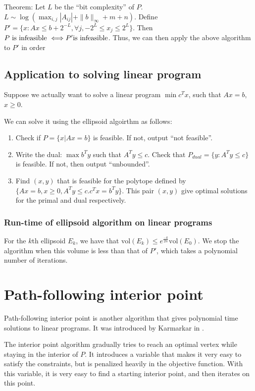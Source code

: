 \documentclass[11pt]{article}
\begin{document}
Theorem: Let $L$ be the ``bit complexity'' of $P$. $L\sim\log(\max_{i,j}|A_{ij}|+\|b\|_{\infty}+m+n)$.
Define $P'=\{x:Ax\leq b+2^{-L},\forall j,-2^{L}\leq x_{j}\leq2^{L}\}$.
Then $P\mbox{ is infeasible \ensuremath{\iff}\ensuremath{P'}is infeasible}$.
Thus, we can then apply the above algorithm to $P'$ in order 


\subsection{Application to solving linear program}

Suppose we actually want to solve a linear program $\min c^{T}x$,
such that $Ax=b$, $x\geq0$.

We can solve it using the ellipsoid algoirthm as follows:
\begin{enumerate}
\item Check if $P=\{x|Ax=b\}$ is feasible. If not, output ``not feasible''.
\item Write the dual: $\max b^{T}y$ such that $A^{T}y\leq c$. Check that
$P_{dual}=\{y:A^{T}y\leq c\}$ is feasible. If not, then output ``unbounded''.
\item Find $(x,y)$ that is feasible for the polytope defined by $\{Ax=b,x\geq0,A^{T}y\leq c.c^{T}x=b^{T}y\}$.
This pair $(x,y)$ give optimal solutions for the primal and dual
respectively.
\end{enumerate}

\subsubsection{Run-time of ellipsoid algorithm on linear programs}

For the $k$th ellipsoid $E_{k}$, we have that $\mbox{vol}(E_{k})\leq e^{\frac{-k}{2n}}\mbox{vol}(E_{0})$.
We stop the algorithm when this volume is less than that of $P'$,
which takes a polynomial number of iterations.


\section{Path-following interior point}

Path-following interior point is another algorithm that gives polynomial
time solutions to linear programs. It was introduced by Karmarkar
in \cite{Karmarkar84}.

The interior point algorithm gradually tries to reach an optimal vertex
while staying in the interior of $P$. It introduces a variable that
makes it very easy to satisfy the constraints, but is penalized heavily
in the objective function. With this variable, it is very easy to
find a starting interior point, and then iterates on this point.
\end{document}
